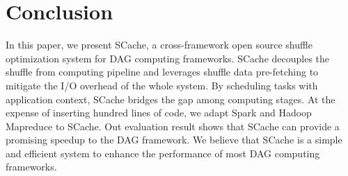 \section{Conclusion}
 In this paper, we present SCache, a cross-framework open source shuffle optimization system for DAG computing frameworks. SCache decouples the shuffle from computing pipeline and leverages shuffle data pre-fetching to mitigate the I/O overhead of the whole system. By scheduling tasks with application context, SCache bridges the gap among computing stages. 
 {\color{blue}
 At the expense of inserting hundred lines of code, we adapt Spark and Hadoop Mapreduce to SCache. Out evaluation result shows that SCache can provide a promising speedup to the DAG framework.
 }
 We believe that SCache is a simple and efficient system to enhance the performance of most DAG computing frameworks. 